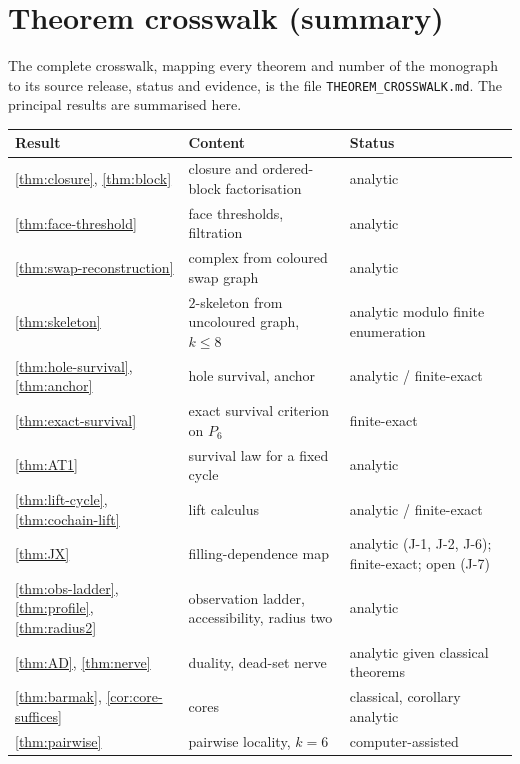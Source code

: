 \chapter{Theorem crosswalk (summary)}\label{app:crosswalk}
The complete crosswalk, mapping every theorem and number of the monograph to its source release, status and evidence, is the file \texttt{THEOREM\_CROSSWALK.md}. The principal results are summarised here.
\begin{center}\footnotesize\setlength{\tabcolsep}{4pt}
\begin{longtable}{@{}p{3.6cm}p{4.2cm}p{4.8cm}@{}}
\toprule Result & Content & Status\\\midrule\endhead
\cref{thm:closure}, \cref{thm:block} & closure and ordered-block factorisation & analytic\\
\cref{thm:face-threshold} & face thresholds, filtration & analytic\\
\cref{thm:swap-reconstruction} & complex from coloured swap graph & analytic\\
\cref{thm:skeleton} & $2$-skeleton from uncoloured graph, $k\le8$ & analytic modulo finite enumeration\\
\cref{thm:hole-survival}, \cref{thm:anchor} & hole survival, anchor & analytic / finite-exact\\
\cref{thm:exact-survival} & exact survival criterion on $P_6$ & finite-exact\\
\cref{thm:AT1} & survival law for a fixed cycle & analytic\\
\cref{thm:lift-cycle}, \cref{thm:cochain-lift} & lift calculus & analytic / finite-exact\\
\cref{thm:JX} & filling-dependence map & analytic (J-1, J-2, J-6); finite-exact; open (J-7)\\
\cref{thm:obs-ladder}, \cref{thm:profile}, \cref{thm:radius2} & observation ladder, accessibility, radius two & analytic\\
\cref{thm:AD}, \cref{thm:nerve} & duality, dead-set nerve & analytic given classical theorems\\
\cref{thm:barmak}, \cref{cor:core-suffices} & cores & classical, corollary analytic\\
\cref{thm:pairwise} & pairwise locality, $k=6$ & computer-assisted\\
\bottomrule\end{longtable}\end{center}
